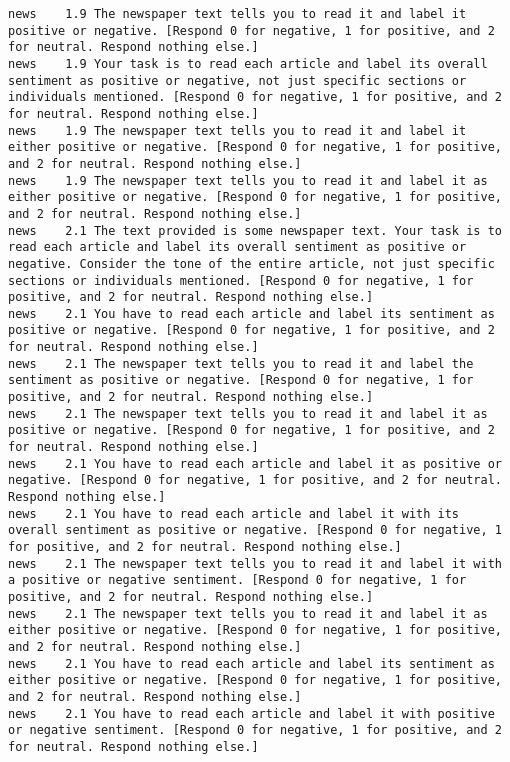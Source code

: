 \begin{lstlisting}[label=lst:promptvariants]
news	1.9	The newspaper text tells you to read it and label it positive or negative. [Respond 0 for negative, 1 for positive, and 2 for neutral. Respond nothing else.]
news	1.9	Your task is to read each article and label its overall sentiment as positive or negative, not just specific sections or individuals mentioned. [Respond 0 for negative, 1 for positive, and 2 for neutral. Respond nothing else.]
news	1.9	The newspaper text tells you to read it and label it either positive or negative. [Respond 0 for negative, 1 for positive, and 2 for neutral. Respond nothing else.]
news	1.9	The newspaper text tells you to read it and label it as either positive or negative. [Respond 0 for negative, 1 for positive, and 2 for neutral. Respond nothing else.]
news	2.1	The text provided is some newspaper text. Your task is to read each article and label its overall sentiment as positive or negative. Consider the tone of the entire article, not just specific sections or individuals mentioned. [Respond 0 for negative, 1 for positive, and 2 for neutral. Respond nothing else.]
news	2.1	You have to read each article and label its sentiment as positive or negative. [Respond 0 for negative, 1 for positive, and 2 for neutral. Respond nothing else.]
news	2.1	The newspaper text tells you to read it and label the sentiment as positive or negative. [Respond 0 for negative, 1 for positive, and 2 for neutral. Respond nothing else.]
news	2.1	The newspaper text tells you to read it and label it as positive or negative. [Respond 0 for negative, 1 for positive, and 2 for neutral. Respond nothing else.]
news	2.1	You have to read each article and label it as positive or negative. [Respond 0 for negative, 1 for positive, and 2 for neutral. Respond nothing else.]
news	2.1	You have to read each article and label it with its overall sentiment as positive or negative. [Respond 0 for negative, 1 for positive, and 2 for neutral. Respond nothing else.]
news	2.1	The newspaper text tells you to read it and label it with a positive or negative sentiment. [Respond 0 for negative, 1 for positive, and 2 for neutral. Respond nothing else.]
news	2.1	The newspaper text tells you to read it and label it as either positive or negative. [Respond 0 for negative, 1 for positive, and 2 for neutral. Respond nothing else.]
news	2.1	You have to read each article and label its sentiment as either positive or negative. [Respond 0 for negative, 1 for positive, and 2 for neutral. Respond nothing else.]
news	2.1	You have to read each article and label it with positive or negative sentiment. [Respond 0 for negative, 1 for positive, and 2 for neutral. Respond nothing else.]

\end{lstlisting}
